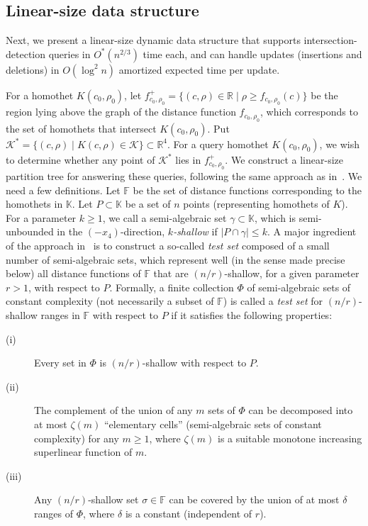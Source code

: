 \documentclass[11pt]{article}
\def\reals{{\mathbb R}}
\def\Fspace{{\mathbb F}}
\def\Kspace{{\mathbb K}}
\def\K{\mathcal{K}}
\theoremstyle{definition}
\begin{document}
\subsection{Linear-size data structure}
\label{subsec:linear}

Next, we present a linear-size dynamic data structure that supports intersection-detection queries 
in $O^*(n^{2/3})$ time each, and can handle updates (insertions and deletions) in $O(\log^2 n)$ 
amortized expected time per update.

For a homothet $K(c_0,\rho_0)$, let $f_{c_0,\rho_0}^+ = \{(c,\rho) \in \reals \mid \rho \ge f_{c_0,\rho_0}(c) \}$ 
be the region lying above the graph of the distance function $f_{c_0,\rho_0}$, which corresponds to the set of 
homothets that intersect $K({c_0,\rho_0})$. Put $\K^* = \{(c,\rho) \mid K(c,\rho) \in\K\}\subset\reals^4$.
For a query homothet $K(c_0,\rho_0)$, we wish to determine whether any point of $\K^*$ 
lies in $f_{c_0,\rho_0}^+$. We construct a linear-size partition tree for answering these queries, 
following the same approach as in~\cite{AM95,Mat92,ShSh}. We need a few definitions. 
Let $\Fspace$ be the set of distance functions corresponding to the homothets in $\Kspace$.
Let $P \subset \Kspace$ be a set of $n$ points (representing homothets of $K$).
For a parameter $k\ge 1$, we call a semi-algebraic set 
$\gamma \subset \Kspace$, which is semi-unbounded in the $(-x_4)$-direction,
\emph{$k$-shallow} if $|P \cap \gamma| \le k$. 
A major ingredient of the approach in~\cite{Mat92,ShSh} is to construct a 
so-called \emph{test set} composed of a small number of semi-algebraic sets, which
represent well (in the sense made precise below) all distance functions of $\Fspace$ 
that are $(n/r)$-shallow, for a given parameter $r>1$, with respect to $P$. 
Formally, a finite collection $\Phi$ of semi-algebraic sets of constant complexity (not necessarily 
a subset of $\Fspace$) is called a \emph{test set} for $(n/r)$-shallow ranges in $\Fspace$ with 
respect to $P$ if it satisfies the following properties: 

\medskip
  \begin{description}
\item[(i)]
  Every set in $\Phi$ is $(n/r)$-shallow with respect to $P$. 
\item[(ii)]
  The complement of the union of any $m$ sets of $\Phi$ can be decomposed 
  into at most $\zeta(m)$ ``elementary cells'' (semi-algebraic sets of constant complexity) for any $m\ge 1$, 
  where $\zeta(m)$ is a suitable monotone increasing superlinear function of $m$. 
\item[(iii)]
  Any $(n/r)$-shallow set $\sigma\in \Fspace$ can be covered by the union 
  of at most $\delta$ ranges of $\Phi$, where $\delta$ is a constant (independent of $r$).
\end{description}
\end{document}
